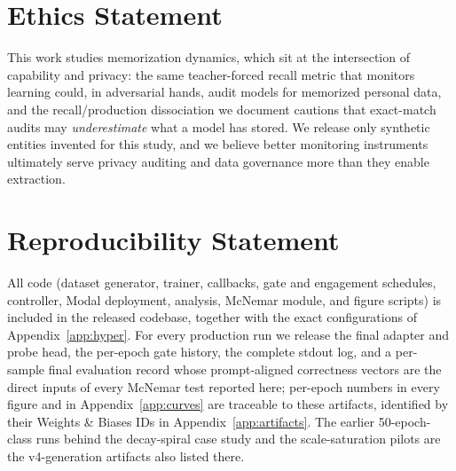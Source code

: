 \section*{Ethics Statement}
This work studies memorization dynamics, which sit at the intersection
of capability and privacy: the same teacher-forced recall metric that
monitors learning could, in adversarial hands, audit models for
memorized personal data, and the recall/production dissociation we
document cautions that exact-match audits may \emph{underestimate}
what a model has stored. We release only synthetic entities invented
for this study, and we believe better monitoring instruments
ultimately serve privacy auditing and data governance more than they
enable extraction.

\section*{Reproducibility Statement}
All code (dataset generator, trainer, callbacks, gate and engagement
schedules, controller, Modal deployment, analysis, McNemar module, and
figure scripts) is included in the released codebase, together with
the exact configurations of Appendix~\ref{app:hyper}. For every
production run we release the final adapter and probe head, the
per-epoch gate history, the complete stdout log, and a per-sample
final evaluation record whose prompt-aligned correctness vectors are
the direct inputs of every McNemar test reported here; per-epoch
numbers in every figure and in Appendix~\ref{app:curves} are
traceable to these artifacts, identified by their Weights \& Biases
IDs in Appendix~\ref{app:artifacts}. The earlier 50-epoch-class runs
behind the decay-spiral case study and the scale-saturation pilots
are the v4-generation artifacts also listed there.
